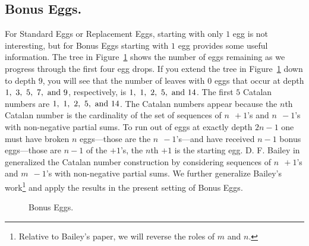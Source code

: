 \documentclass[12pt]{amsart}
\theoremstyle{definition}
\theoremstyle{theorem}
\begin{document}
\subsection{Bonus Eggs.}

For Standard Eggs or Replacement Eggs, starting with only $1$ egg is not interesting,
but for  Bonus Eggs starting with $1$ egg provides some useful information.
The tree in Figure~\ref{bonus.eggs} shows the number of eggs remaining
as we progress through the first four egg drops.
If you extend   the tree in Figure~\ref{bonus.eggs}  down to depth $9$, you will see
that the number of leaves with $0$ eggs 
that occur  at depth $1,\ 3,\ 5,\ 7,\ \hbox{\rm and\ }9$, respectively,
is $1,\ 1,\ 2,\ 5,\ \hbox{\rm and\ }14$.  The first $5$ Catalan numbers
are  $1,\ 1,\ 2,\ 5,\ \hbox{\rm and\ }14$.  The Catalan numbers
appear because the $n$th Catalan number is the cardinality of the set of
sequences of $n\ \ {+}1$'s and $n\ \ {-}1$'s with non-negative partial sums. 
To run out of eggs at exactly depth $2n-1$ one must have broken $n$ eggs---those
are the $n\ \ {-}1$'s---and have received  $n-1$ bonus eggs---those are $n-1$ of the ${+}1$'s, the $n$th 
${+}1$ is the starting egg.
D. F. Bailey in \cite{Bailey_Counting} generalized the Catalan number construction
by considering   sequences of $n\ \ {+}1$'s and $m\ \ {-}1$'s with non-negative partial sums. 
We  further generalize Bailey's work\footnote{Relative to Bailey's paper, we will reverse the roles
of $m$ and $n$.} and apply the results in the present setting
of Bonus Eggs.  

\begin{figure}[htp]\centering    %
\caption{Bonus Eggs.} \label{bonus.eggs}
\end{figure}
\end{document}
